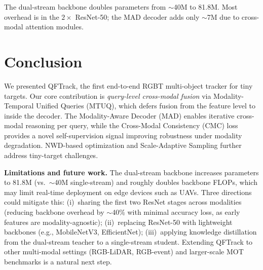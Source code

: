 \documentclass[10pt,twocolumn,letterpaper]{article}
\begin{document}
The dual-stream backbone doubles parameters from ${\sim}$40M to 81.8M. Most overhead is in the $2\times$ ResNet-50; the MAD decoder adds only ${\sim}$7M due to cross-modal attention modules.

\section{Conclusion}

We presented QFTrack, the first end-to-end RGBT multi-object tracker for tiny targets. Our core contribution is \textit{query-level cross-modal fusion} via Modality-Temporal Unified Queries (MTUQ), which defers fusion from the feature level to inside the decoder. The Modality-Aware Decoder (MAD) enables iterative cross-modal reasoning per query, while the Cross-Modal Consistency (CMC) loss provides a novel self-supervision signal improving robustness under modality degradation. NWD-based optimization and Scale-Adaptive Sampling further address tiny-target challenges.

\textbf{Limitations and future work.}
The dual-stream backbone increases parameters to 81.8M (vs.\ ${\sim}$40M single-stream) and roughly doubles backbone FLOPs, which may limit real-time deployment on edge devices such as UAVs.
Three directions could mitigate this:
(i)~sharing the first two ResNet stages across modalities (reducing backbone overhead by ${\sim}$40\% with minimal accuracy loss, as early features are modality-agnostic);
(ii)~replacing ResNet-50 with lightweight backbones (e.g., MobileNetV3, EfficientNet);
(iii)~applying knowledge distillation from the dual-stream teacher to a single-stream student.
Extending QFTrack to other multi-modal settings (RGB-LiDAR, RGB-event) and larger-scale MOT benchmarks is a natural next step.

{\small


}
\end{document}
